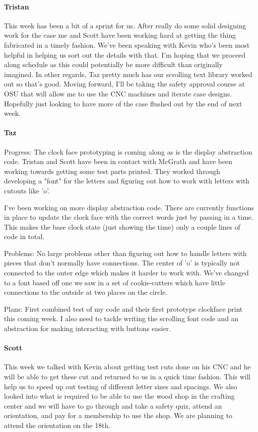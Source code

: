 \documentclass[onecolumn, draftclsnofoot,10pt, compsoc]{IEEEtran}
\begin{document}
\paragraph{Tristan}
This week has been a bit of a sprint for us. After really do some solid designing work for the case me and Scott have been working hard at getting the thing fabricated in a timely fashion. We've been speaking with Kevin who's been most helpful in helping us sort out the details with that. I'm hoping that we proceed along schedule as this could potentially be more difficult than originally imagined. In other regards, Taz pretty much has our scrolling text library worked out so that's good. Moving forward, I'll be taking the safety approval course at OSU that will allow me to use the CNC machines and iterate case designs. Hopefully just looking to have more of the case flushed out by the end of next week.
\paragraph{Taz}
Progress: The clock face prototyping is coming along as is the display abstraction code. Tristan and Scott have been in contact with McGrath and have been working towards getting some test parts printed. They worked through developing a "font" for the letters and figuring out how to work with letters with cutouts like 'o'.

I've been working on more display abstraction code. There are currently functions in place to update the clock face with the correct words just by passing in a time. This makes the base clock state (just showing the time) only a couple lines of code in total.

Problems: No large problems other than figuring out how to handle letters with pieces that don't normally have connections. The center of 'o' is typically not connected to the outer edge which makes it harder to work with. We've changed to a font based off one we saw in a set of cookie-cutters which have little connections to the outside at two places on the circle.

Plans: First combined test of my code and their first prototype clockface print this coming week. I also need to tackle writing the scrolling font code and an abstraction for making interacting with buttons easier.
\paragraph{Scott}
This week we talked with Kevin about getting test cuts done on his CNC and he will be able to get these cut and returned to us in a quick time fashion. This will help us to speed up out testing of different letter sizes and spacings. We also looked into what is required to be able to use the wood shop in the crafting center and we will have to go through and take a safety quiz, attend an orientation, and pay for a membership to use the shop. We are planning to attend the orientation on the 18th.
\end{document}
